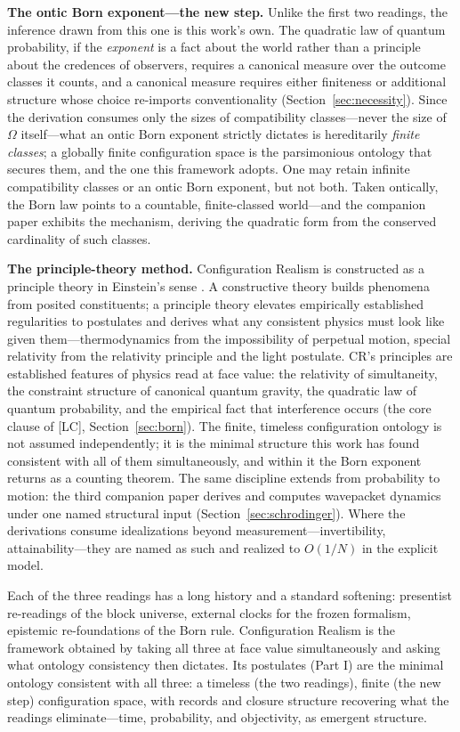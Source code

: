 \documentclass[11pt]{article}
\theoremstyle{definition}
\theoremstyle{remark}
\begin{document}
\textbf{The ontic Born exponent---the new step.} Unlike the first two readings, the inference drawn from this one is this work's own. The quadratic law of quantum probability, if the \emph{exponent} is a fact about the world rather than a principle about the credences of observers, requires a canonical measure over the outcome classes it counts, and a canonical measure requires either finiteness or additional structure whose choice re-imports conventionality (Section~\ref{sec:necessity}). Since the derivation consumes only the sizes of compatibility classes---never the size of $\Omega$ itself---what an ontic Born exponent strictly dictates is hereditarily \emph{finite classes}; a globally finite configuration space is the parsimonious ontology that secures them, and the one this framework adopts. One may retain infinite compatibility classes or an ontic Born exponent, but not both. Taken ontically, the Born law points to a countable, finite-classed world---and the companion paper \cite{TillittBorn} exhibits the mechanism, deriving the quadratic form from the conserved cardinality of such classes.

\textbf{The principle-theory method.} Configuration Realism is constructed as a principle theory in Einstein's sense \cite{Einstein1919}. A constructive theory builds phenomena from posited constituents; a principle theory elevates empirically established regularities to postulates and derives what any consistent physics must look like given them---thermodynamics from the impossibility of perpetual motion, special relativity from the relativity principle and the light postulate. CR's principles are established features of physics read at face value: the relativity of simultaneity, the constraint structure of canonical quantum gravity, the quadratic law of quantum probability, and the empirical fact that interference occurs (the core clause of [LC], Section~\ref{sec:born}). The finite, timeless configuration ontology is not assumed independently; it is the minimal structure this work has found consistent with all of them simultaneously, and within it the Born exponent returns as a counting theorem. The same discipline extends from probability to motion: the third companion paper derives and computes wavepacket dynamics under one named structural input (Section~\ref{sec:schrodinger}). Where the derivations consume idealizations beyond measurement---invertibility, attainability---they are named as such and realized to $O(1/N)$ in the explicit model.

Each of the three readings has a long history and a standard softening: presentist re-readings of the block universe, external clocks for the frozen formalism, epistemic re-foundations of the Born rule. Configuration Realism is the framework obtained by taking all three at face value simultaneously and asking what ontology consistency then dictates. Its postulates (Part I) are the minimal ontology consistent with all three: a timeless (the two readings), finite (the new step) configuration space, with records and closure structure recovering what the readings eliminate---time, probability, and objectivity, as emergent structure.
\end{document}
